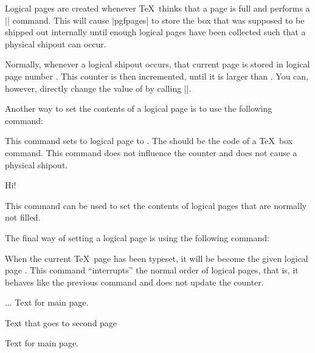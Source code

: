 Logical pages are created whenever \TeX\ thinks that a page is full and
performs a |\shipout| command. This will cause |pgfpages| to store the box that
was supposed to be shipped out internally until enough logical pages have been
collected such that a physical shipout can occur.

Normally, whenever a logical shipout occurs, that current page is stored in
logical page number . This counter is then
incremented, until it is larger than . You can,
however, directly change the value of  by calling
|\pgfpagesphysicalpageoptions|.

Another way to set the contents of a logical page is to use the following
command:

\begin{command}{\pgfpagesshipoutlogicalpage{}}
    This command sets to logical page  to . The
     should be the code of a \TeX\ box command. This command does not
    influence the counter  and does not cause a
    physical shipout.
\begin{codeexample}
\vbox{Hi!}
\end{codeexample}

    This command can be used to set the contents of logical pages that are
    normally not filled.
\end{command}

The final way of setting a logical page is using the following command:

\begin{command}{\pgfpagescurrentpagewillbelogicalpage{}}
    When the current \TeX\ page has been typeset, it will be become the given
    logical page . This command ``interrupts'' the normal order of
    logical pages, that is, it behaves like the previous command and does not
    update the  counter.
\begin{codeexample}
...
Text for main page.
\clearpage

Text that goes to second page
\clearpage

Text for main page.
\end{codeexample}
\end{command}


